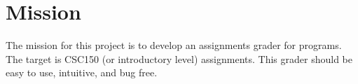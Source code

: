 
\chapter{Mission}

The mission for this project is to develop an assignments grader for programs. The target is CSC150 (or introductory level) assignments. This grader should be easy to use, intuitive, and bug free.
